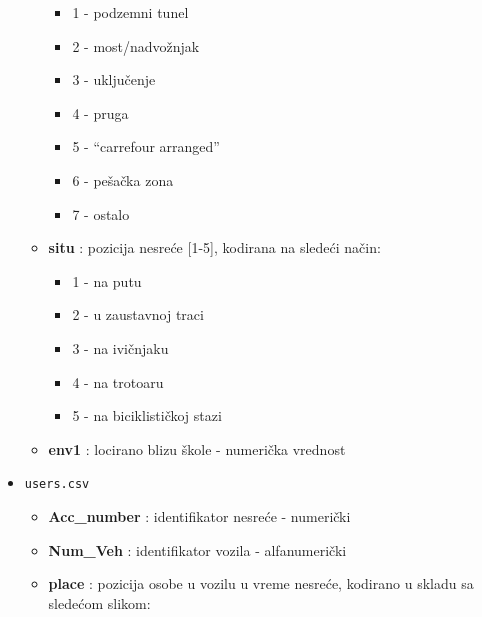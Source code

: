 \documentclass[a4paper,10pt]{article}
\begin{document}
\begin{itemize}
\begin{itemize}
\begin{itemize}
	 \item 1 - podzemni tunel
	 \item 2 - most/nadvožnjak
	 \item 3 - uključenje
	 \item 4 - pruga
	 \item 5 - ``carrefour arranged''
	 \item 6 - pešačka zona
	 \item 7 - ostalo
	\end{itemize}
  \item \textbf{situ} : pozicija nesreće [1-5], kodirana na sledeći način:
	\begin{itemize}
	 \item 1 - na putu
	 \item 2 - u zaustavnoj traci
	 \item 3 - na ivičnjaku
	 \item 4 - na trotoaru
	 \item 5 - na biciklističkoj stazi
	\end{itemize}
  \item \textbf{env1} : locirano blizu škole - numerička vrednost
 \end{itemize}

 \item \texttt{users.csv}
 \begin{itemize}
  \item \textbf{Acc\_number} : identifikator nesreće - numerički
  \item \textbf{Num\_Veh} : identifikator vozila - alfanumerički
  \item \textbf{place} : pozicija osobe u vozilu u vreme nesreće, kodirano u skladu sa sledećom slikom:
  
\begin{minipage}{0.7\textwidth}
 \centering
\end{minipage}
  

\end{itemize}
\end{itemize}
\end{document}
